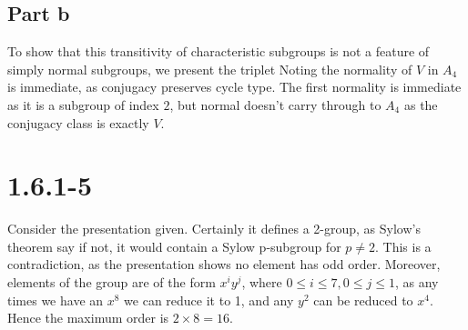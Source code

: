 \documentclass{article}
\begin{document}
\subsection{Part b}
To show that this transitivity of characteristic subgroups is not a feature of simply normal subgroups, we present the triplet
Noting the normality of $V$ in $A_4$ is immediate, as conjugacy preserves cycle type. The first normality is immediate as it is a subgroup of index $2$, but normal doesn't carry through to $A_4$ as the conjugacy class is exactly $V$. 

\section{1.6.1-5}
Consider the presentation given. Certainly it defines a 2-group, as Sylow's theorem say if not, it would contain a Sylow  p-subgroup for $p \neq 2$. This is a contradiction, as the presentation shows no element has odd order. Moreover, elements of the group are of the form $x^iy^j$, where $0 \leq i \leq 7, 0 \leq j \leq 1$, as any times we have an $x^8$ we can reduce it to 1, and any $y^2$ can be reduced to $x^4$. Hence the maximum order is $2 \times 8 = 16$. 
\end{document}
